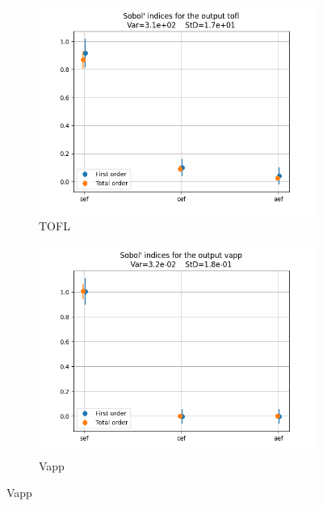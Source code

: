 \documentclass[a4paper, 11pt]{article}
\begin{document}
\begin{figure}[H]
    \vspace{10pt} %

    \begin{subfigure}[b]{0.45\textwidth}
        \includegraphics[width=\textwidth]{Images_Ayoub/Problem2/X_opt/Sobol_Indices/tofl.png}
        \caption{TOFL}
        \label{fig:tofl}
    \end{subfigure}
    \hfill
    \begin{subfigure}[b]{0.45\textwidth}
        \includegraphics[width=\textwidth]{Images_Ayoub/Problem2/X_opt/Sobol_Indices/vapp.png}
        \caption{Vapp}
        \label{fig:vapp}
    \end{subfigure}


\end{figure}
\end{document}
